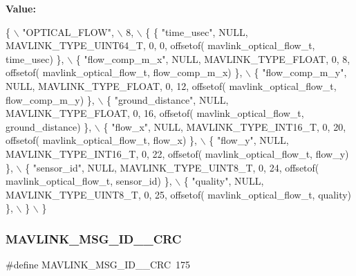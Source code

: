 {\bfseries Value\+:}
\begin{DoxyCode}
\{ \(\backslash\)
    \textcolor{stringliteral}{"OPTICAL\_FLOW"}, \(\backslash\)
    8, \(\backslash\)
    \{  \{ \textcolor{stringliteral}{"time\_usec"}, NULL, MAVLINK_TYPE_UINT64_T, 0, 0, offsetof(
      mavlink_optical_flow_t, time\_usec) \}, \(\backslash\)
         \{ \textcolor{stringliteral}{"flow\_comp\_m\_x"}, NULL, MAVLINK_TYPE_FLOAT, 0, 8, offsetof(
      mavlink_optical_flow_t, flow\_comp\_m\_x) \}, \(\backslash\)
         \{ \textcolor{stringliteral}{"flow\_comp\_m\_y"}, NULL, MAVLINK_TYPE_FLOAT, 0, 12, offsetof(
      mavlink_optical_flow_t, flow\_comp\_m\_y) \}, \(\backslash\)
         \{ \textcolor{stringliteral}{"ground\_distance"}, NULL, MAVLINK_TYPE_FLOAT, 0, 16, offsetof(
      mavlink_optical_flow_t, ground\_distance) \}, \(\backslash\)
         \{ \textcolor{stringliteral}{"flow\_x"}, NULL, MAVLINK_TYPE_INT16_T, 0, 20, offsetof(
      mavlink_optical_flow_t, flow\_x) \}, \(\backslash\)
         \{ \textcolor{stringliteral}{"flow\_y"}, NULL, MAVLINK_TYPE_INT16_T, 0, 22, offsetof(
      mavlink_optical_flow_t, flow\_y) \}, \(\backslash\)
         \{ \textcolor{stringliteral}{"sensor\_id"}, NULL, MAVLINK_TYPE_UINT8_T, 0, 24, offsetof(
      mavlink_optical_flow_t, sensor\_id) \}, \(\backslash\)
         \{ \textcolor{stringliteral}{"quality"}, NULL, MAVLINK_TYPE_UINT8_T, 0, 25, offsetof(
      mavlink_optical_flow_t, quality) \}, \(\backslash\)
         \} \(\backslash\)
\}
\end{DoxyCode}
\mbox{\label{mavlink__msg__optical__flow_8h_ada84be4470f4095314875bf10e8436fe}} 
\subsubsection{M\+A\+V\+L\+I\+N\+K\+\_\+\+M\+S\+G\+\_\+\+I\+D\+\_\+\_\+\+C\+RC}
{\footnotesize\ttfamily \#define M\+A\+V\+L\+I\+N\+K\+\_\+\+M\+S\+G\+\_\+\+I\+D\+\_\+\_\+\+C\+RC~175}

\mbox{\label{mavlink__msg__optical__flow_8h_af75c33486d37c0fbc737add254a9a940}} 
